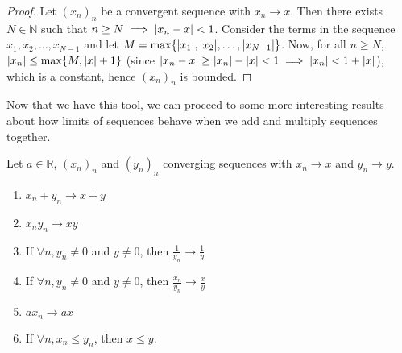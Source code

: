 \documentclass[../real_analysis.tex]{subfiles}
\begin{document}
        \begin{proof}
            Let $(x_n)_n$ be a convergent sequence with $x_n\to x$. Then there exists $N\in\mathbb{N}$ such that $n\geq N\implies\lvert x_n-x\rvert<1$. Consider the terms in the sequence $x_1, x_2,\dots,x_{N-1}$ and let $M=\max\{\lvert x_1\rvert,\lvert x_2\rvert,\dots,\lvert x_{N-1}\rvert\}$.
            Now, for all $n\geq N$, $\lvert x_n\rvert\leq\max\{M, \lvert x\rvert+1\}$ (since $\lvert x_n-x\rvert\geq\lvert x_n\rvert-\lvert x\rvert<1\implies\lvert x_n\rvert<1+\lvert x\rvert$), which is a constant, hence $(x_n)_n$ is bounded.
        \end{proof}
        Now that we have this tool, we can proceed to some more interesting results about how limits of sequences behave when we add and multiply sequences together.
        \begin{theorem}\label{seq-lim-props}
            Let $a\in\mathbb{R}$, $(x_n)_n$ and $(y_n)_n$ converging sequences with $x_n\to x$ and $y_n\to y$.
            \begin{enumerate}[\upshape(i)]
                \item $x_n+y_n\to x+y$
                \item $x_ny_n\to xy$
                \item If $\forall n, y_n\neq0$ and $y\neq0$, then $\frac{1}{y_n}\to\frac{1}{y}$
                \item If $\forall n, y_n\neq0$ and $y\neq0$, then $\frac{x_n}{y_n}\to\frac{x}{y}$
                \item $ax_n\to ax$
                \item If $\forall n, x_n\leq y_n$, then $x\leq y$.
            \end{enumerate}
        \end{theorem}
\end{document}
